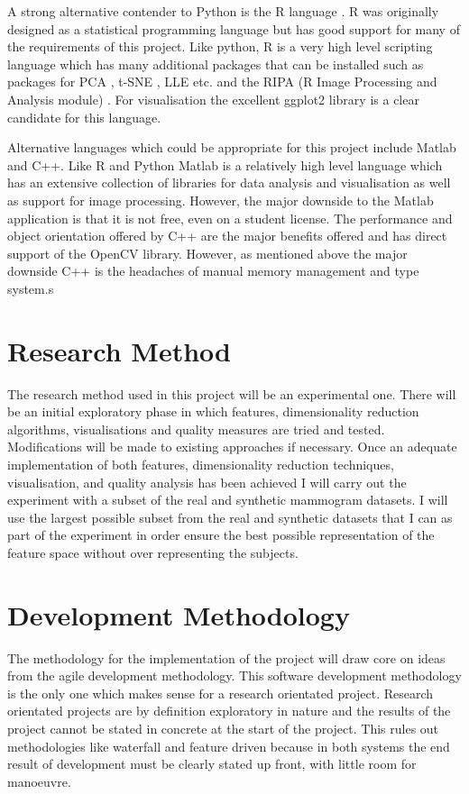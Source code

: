 A strong alternative contender to Python is the R language \cite{rlanguage}. R was originally designed as a statistical programming language but has good support for many of the requirements of this project. Like python, R is a very high level scripting language which has many additional packages that can be installed such as packages for PCA \cite{rPCA}, t-SNE \cite{rtSNE}, LLE \cite{rLLE} etc. and the RIPA (R Image Processing and Analysis module) \cite{rRIPA}. For visualisation the excellent ggplot2 \cite{rggplot2} library is a clear candidate for this language.

Alternative languages which could be appropriate for this project include Matlab and C++. Like R and Python Matlab \cite{matlab} is a relatively high level language which has an extensive collection of libraries for data analysis and visualisation as well as support for image processing. However, the major downside to the Matlab application is that it is not free, even on a student license. The performance and object orientation offered by C++ are the major benefits offered and has direct support of the OpenCV library. However, as mentioned above the major downside C++ is the headaches of manual memory management and type system.s 

\section{Research Method}
The research method used in this project will be an experimental one. There will be an initial exploratory phase in which features, dimensionality reduction algorithms, visualisations and quality measures are tried and tested. Modifications will be made to existing approaches if necessary. Once an adequate implementation of both features, dimensionality reduction techniques, visualisation, and quality analysis has been achieved I will carry out the experiment with a subset of the real and synthetic mammogram datasets. I will use the largest possible subset from the real and synthetic datasets that I can as part of the experiment in order ensure the best possible representation of the feature space without over representing the subjects.

\section{Development Methodology}
The methodology for the implementation of the project will draw core on ideas from the agile development methodology. This software development methodology is the only one which makes sense for a research orientated project. Research orientated projects are by definition exploratory in nature and the results of the project cannot be stated in concrete at the start of the project. This rules out methodologies like waterfall and feature driven because in both systems the end result of development must be clearly stated up front, with little room for manoeuvre.


